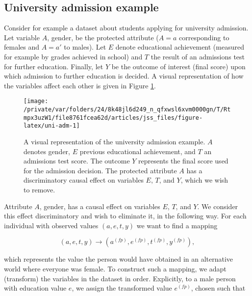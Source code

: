 \documentclass[
  nojss]{jss}
\begin{document}
\hypertarget{university-admission-example}{%
\subsection{University admission
example}\label{university-admission-example}}

Consider for example a dataset about students applying for university
admission. Let variable \(A\), gender, be the protected attribute
(\(A = a\) corresponding to females and \(A = a'\) to males). Let \(E\)
denote educational achievement (measured for example by grades achieved
in school) and \(T\) the result of an admissions test for further
education. Finally, let \(Y\) be the outcome of interest (final score)
upon which admission to further education is decided. A visual
representation of how the variables affect each other is given in Figure
\ref{fig:uni-adm}.

\begin{CodeChunk}
\begin{figure}

{\centering \texttt{[image: /private/var/folders/24/8k48jl6d249\_n\_qfxwsl6xvm0000gn/T/Rtmpx3uzW1/file8761fcea62d/articles/jss\_files/figure-latex/uni-adm-1]} 

}

\caption[A visual representation of the university admission example]{A visual representation of the university admission example. $A$ denotes gender, $E$ previous educational achievement, and $T$ an admissions test score. The outcome $Y$ represents the final score used for the admission decision. The protected attribute $A$ has a discriminatory causal effect on variables $E$, $T$, and $Y$, which we wish to remove.}\label{fig:uni-adm}
\end{figure}
\end{CodeChunk}

Attribute \(A\), gender, has a causal effect on variables \(E\), \(T\),
and \(Y\). We consider this effect discriminatory and wish to eliminate
it, in the following way. For each individual with observed values
\((a, e, t, y)\) we want to find a mapping

\[(a, e, t, y) \longrightarrow  ( {a}^{(fp)},  {e}^{(fp)},  {t}^{(fp)},  {y}^{(fp)}),\]

which represents the value the person would have obtained in an
alternative world where everyone was female. To construct such a
mapping, we adapt (transform) the variables in the dataset in order.
Explicitly, to a male person with education value \(e\), we assign the
transformed value \( {e}^{(fp)}\), chosen such that
\end{document}
